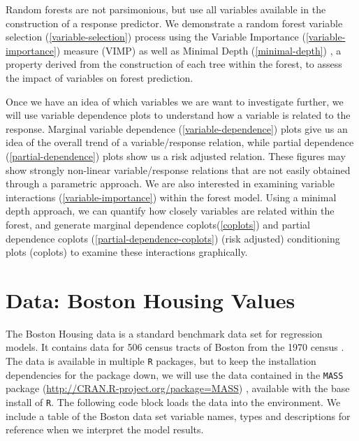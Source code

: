 \documentclass[article]{jss}
\begin{document}
Random forests are not parsimonious, but use all variables available in
the construction of a response predictor. We demonstrate a random forest
variable selection (\autoref{variable-selection}) process using the
Variable Importance (\autoref{variable-importance}) measure (VIMP)
\citep{Breiman:2001} as well as Minimal Depth (\autoref{minimal-depth})
\citep{Ishwaran:2010}, a property derived from the construction of each
tree within the forest, to assess the impact of variables on forest
prediction.

Once we have an idea of which variables we are want to investigate
further, we will use variable dependence plots \citep{Friedman:2000} to
understand how a variable is related to the response. Marginal variable
dependence (\autoref{variable-dependence}) plots give us an idea of the
overall trend of a variable/response relation, while partial dependence
(\autoref{partial-dependence}) plots show us a risk adjusted relation.
These figures may show strongly non-linear variable/response relations
that are not easily obtained through a parametric approach. We are also
interested in examining variable interactions
(\autoref{variable-importance}) within the forest model. Using a minimal
depth approach, we can quantify how closely variables are related within
the forest, and generate marginal dependence coplots(\autoref{coplots})
and partial dependence coplots (\autoref{partial-dependence-coplots})
(risk adjusted) conditioning plots (coplots)
\citep[\citet{cleveland:1993}]{chambers:1992} to examine these
interactions graphically.

\section{Data: Boston Housing Values}\label{data-boston-housing-values}

The Boston Housing data is a standard benchmark data set for regression
models. It contains data for 506 census tracts of Boston from the 1970
census \citep[\citet{Belsley:1980}]{Harrison:1978}. The data is
available in multiple \texttt{R} packages, but to keep the installation
dependencies for the  package down, we will use the
data contained in the \texttt{MASS} package
(\url{http://CRAN.R-project.org/package=MASS}) \citep{mass:2002},
available with the base install of \texttt{R}. The following code block
loads the data into the environment. We include a table of the Boston
data set variable names, types and descriptions for reference when we
interpret the model results.
\end{document}
